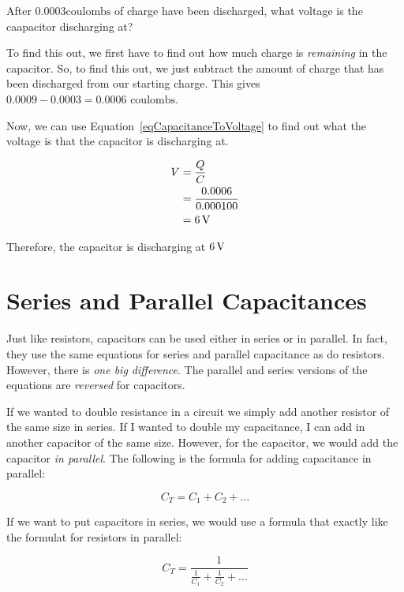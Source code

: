 \begin{exampleprob}
After $0.0003 \textrm{coulombs}$ of charge have been discharged, what voltage is the caapacitor discharging at?

To find this out, we first have to find out how much charge is \emph{remaining} in the capacitor.  
So, to find this out, we just subtract the amount of charge that has been discharged from our starting charge.
This gives $0.0009 - 0.0003 = 0.0006 \textrm{ coulombs}$.

Now, we can use Equation~\ref{eqCapacitanceToVoltage} to find out what the voltage is that the capacitor is discharging at.

\begin{align*}
V &= \frac{Q}{C} \\
  &= \frac{0.0006}{0.000100} \\
  &= 6\,\si{\volt}
\end{align*}

Therefore, the capacitor is discharging at $6\,\si{\volt}$
\end{exampleprob}

\section{Series and Parallel Capacitances}

Just like resistors, capacitors can be used either in series or in parallel.
In fact, they use the same equations for series and parallel capacitance as do resistors.
However, there is \emph{one big difference}.  
The parallel and series versions of the equations are \emph{reversed} for capacitors.

If we wanted to double resistance in a circuit we simply add another resistor of the same size in series.
If I wanted to double my capacitance, I can add in another capacitor of the same size.
However, for the capacitor, we would add the capacitor \emph{in parallel}.
The following is the formula for adding capacitance in parallel:

\begin{equation}
\label{eqCapacitanceParallel}
C_T = C_1 + C_2 + \ldots
\end{equation}

If we want to put capacitors in series, we would use a formula that exactly like the formulat for resistors in parallel:

\begin{equation}
\label{eqCapacitanceSeries}
C_T = \frac{1}{\frac{1}{C_1} + \frac{1}{C_2} + \ldots}
\end{equation}

